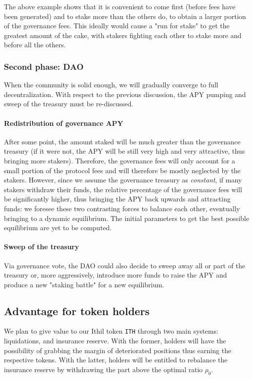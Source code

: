\documentclass[a4paper,10 pt]{article}
\theoremstyle{definition}
\begin{document}
The above example shows that it is convenient to come first (before fees have been generated) and to stake more than the others do, to obtain a larger portion of the governance fees. This ideally would cause a "run for stake" to get the greatest amount of the cake, with stakers fighting each other to stake more and before all the others.

\subsubsection{Second phase: DAO}
When the community is solid enough, we will gradually converge to full decentralization. With respect to the previous discussion, the APY pumping and sweep of the treasury must be re-discussed.

\paragraph{Redistribution of governance APY}
After some point, the amount staked will be much greater than the governance treasury (if it were not, the APY will be still very high and very attractive, thus bringing more stakers). Therefore, the governance fees will only account for a small portion of the protocol fees and will therefore be mostly neglected by the stakers. However, since we assume the governance treasury as {\it constant}, if many stakers withdraw their funds, the relative percentage of the governance fees will be significantly higher, thus bringing the APY back upwards and attracting funds: we foresee these two contrasting forces to balance each other, eventually bringing to a dynamic equilibrium. The initial parameters to get the best possible equilibrium are yet to be computed.

\paragraph{Sweep of the treasury}
Via governance vote, the DAO could also decide to sweep away all or part of the treasury or, more aggressively, introduce more funds to raise the APY and produce a new "staking battle" for a new equilibrium.

\subsection{Advantage for token holders}

We plan to give value to our Ithil token \verb|ITH| through two main systems: liquidations, and insurance reserve. With the former, holders will have the possibility of grabbing the margin of deteriorated positions thus earning the respective tokens. With the latter, holders will be entitled to rebalance the insurance reserve by withdrawing the part above the optimal ratio $\rho_0$.
\end{document}
